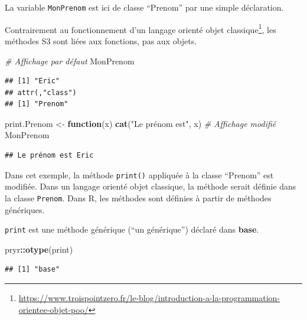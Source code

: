 \documentclass[
  12pt,
  french,
  a4paper,
  extrafontsizes,onecolumn,openright
  ]{memoir}
\newenvironment{Shaded}{\begin{snugshade}}{\end{snugshade}}
\newcommand{\CommentTok}[1]{\textcolor[rgb]{0.56,0.35,0.01}{\textit{#1}}}
\newcommand{\ControlFlowTok}[1]{\textcolor[rgb]{0.13,0.29,0.53}{\textbf{#1}}}
\newcommand{\KeywordTok}[1]{\textcolor[rgb]{0.13,0.29,0.53}{\textbf{#1}}}
\newcommand{\NormalTok}[1]{#1}
\newcommand{\OperatorTok}[1]{\textcolor[rgb]{0.81,0.36,0.00}{\textbf{#1}}}
\newcommand{\StringTok}[1]{\textcolor[rgb]{0.31,0.60,0.02}{#1}}
\begin{document}
\normalsize

La variable \texttt{MonPrenom} est ici de classe \enquote{Prenom} par une simple déclaration.

Contrairement au fonctionnement d'un langage orienté objet classique\footnote{\url{https://www.troispointzero.fr/le-blog/introduction-a-la-programmation-orientee-objet-poo/}}, les méthodes S3 sont liées aux fonctions, pas aux objets.

\scriptsize

\begin{Shaded}
\begin{Highlighting}[]
\CommentTok{# Affichage par défaut}
\NormalTok{MonPrenom}
\end{Highlighting}
\end{Shaded}

\begin{verbatim}
## [1] "Eric"
## attr(,"class")
## [1] "Prenom"
\end{verbatim}

\begin{Shaded}
\begin{Highlighting}[]
\NormalTok{print.Prenom <-}\StringTok{ }\ControlFlowTok{function}\NormalTok{(x) }\KeywordTok{cat}\NormalTok{(}\StringTok{"Le prénom est"}\NormalTok{, x)}
\CommentTok{# Affichage modifié}
\NormalTok{MonPrenom}
\end{Highlighting}
\end{Shaded}

\begin{verbatim}
## Le prénom est Eric
\end{verbatim}

\normalsize

Dans cet exemple, la méthode \texttt{print()} appliquée à la classe \enquote{Prenom} est modifiée.
Dans un langage orienté objet classique, la méthode serait définie dans la classe \texttt{Prenom}.
Dans R, les méthodes sont définies à partir de méthodes génériques.

\texttt{print} est une méthode générique (\enquote{un générique}) déclaré dans \textbf{base}.

\scriptsize

\begin{Shaded}
\begin{Highlighting}[]
\NormalTok{pryr}\OperatorTok{::}\KeywordTok{otype}\NormalTok{(print)}
\end{Highlighting}
\end{Shaded}

\begin{verbatim}
## [1] "base"
\end{verbatim}
\end{document}
